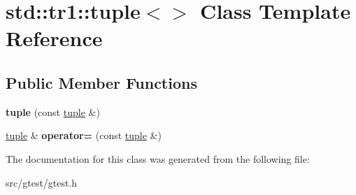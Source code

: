 \hypertarget{classstd_1_1tr1_1_1tuple_3_4}{}\section{std\+:\+:tr1\+:\+:tuple$<$$>$ Class Template Reference}
\label{classstd_1_1tr1_1_1tuple_3_4}
\subsection*{Public Member Functions}
\begin{DoxyCompactItemize}
\item 
\mbox{\label{classstd_1_1tr1_1_1tuple_3_4_aa857599acb126134e29dc5e53fd9d1a7}} 
{\bfseries tuple} (const \mbox{\hyperlink{classstd_1_1tr1_1_1tuple}{tuple}} \&)
\item 
\mbox{\label{classstd_1_1tr1_1_1tuple_3_4_a93ddab6f662662fc49635608619150c8}} 
\mbox{\hyperlink{classstd_1_1tr1_1_1tuple}{tuple}} \& {\bfseries operator=} (const \mbox{\hyperlink{classstd_1_1tr1_1_1tuple}{tuple}} \&)
\end{DoxyCompactItemize}


The documentation for this class was generated from the following file\+:\begin{DoxyCompactItemize}
\item 
src/gtest/gtest.\+h\end{DoxyCompactItemize}

